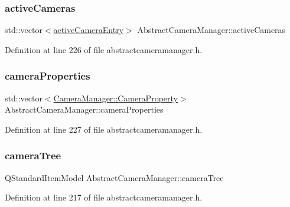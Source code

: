 \subsubsection{\texorpdfstring{activeCameras}{activeCameras}}
{\footnotesize\ttfamily std\+::vector$<$\mbox{\hyperlink{struct_abstract_camera_manager_1_1active_camera_entry}{active\+Camera\+Entry}}$>$ Abstract\+Camera\+Manager\+::active\+Cameras\hspace{0.3cm}{\ttfamily [protected]}}



Definition at line 226 of file abstractcameramanager.\+h.

\mbox{\label{class_abstract_camera_manager_af11e8e49cfd447f24db39409522896a7}} 
\subsubsection{\texorpdfstring{cameraProperties}{cameraProperties}}
{\footnotesize\ttfamily std\+::vector$<$\mbox{\hyperlink{class_camera_manager_1_1_camera_property}{Camera\+Manager\+::\+Camera\+Property}}$>$ Abstract\+Camera\+Manager\+::camera\+Properties\hspace{0.3cm}{\ttfamily [protected]}}



Definition at line 227 of file abstractcameramanager.\+h.

\mbox{\label{class_abstract_camera_manager_a9b502f3e4d39972a14172735eeed4257}} 
\subsubsection{\texorpdfstring{cameraTree}{cameraTree}}
{\footnotesize\ttfamily Q\+Standard\+Item\+Model Abstract\+Camera\+Manager\+::camera\+Tree\hspace{0.3cm}{\ttfamily [protected]}}



Definition at line 217 of file abstractcameramanager.\+h.

\mbox{\label{class_abstract_camera_manager_a990953dbac1ef8b82c661236f6222e40}} 
